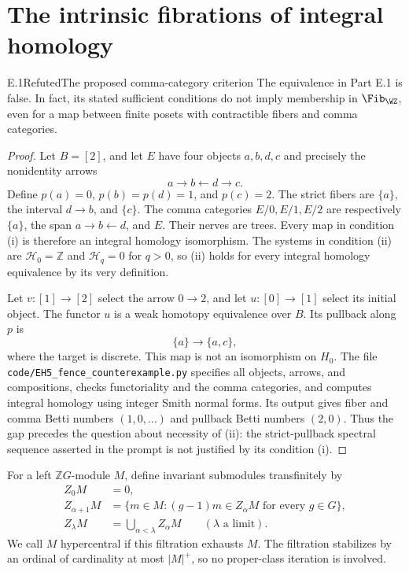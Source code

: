 \section{The intrinsic fibrations of integral homology}

\begin{claim}{E.1}{Refuted}{The proposed comma-category criterion}
The equivalence in Part E.1 is false. In fact, its stated sufficient
conditions do not imply membership in $\Fib_{\WZ}$, even for a map
between finite posets with contractible fibers and comma categories.
\end{claim}
\begin{proof}
Let $B=[2]$, and let $E$ have four objects $a,b,d,c$ and precisely
the nonidentity arrows
\[
                         a\longrightarrow b\longleftarrow d
                           \longrightarrow c.
\]
Define $p(a)=0$, $p(b)=p(d)=1$, and $p(c)=2$. The strict fibers are
$\{a\}$, the interval $d\to b$, and $\{c\}$. The comma categories
$E/0,E/1,E/2$ are respectively $\{a\}$, the span $a\to b\leftarrow d$,
and $E$. Their nerves are trees. Every map in condition (i) is therefore
an integral homology isomorphism. The systems in condition (ii) are
$\mathcal H_0=\mathbb Z$ and $\mathcal H_q=0$ for $q>0$, so (ii)
holds for every integral homology equivalence by its very definition.

Let $v:[1]\to[2]$ select the arrow $0\to2$, and let
$u:[0]\to[1]$ select its initial object. The functor $u$ is a weak
homotopy equivalence over $B$. Its pullback along $p$ is
\[
                          \{a\}\longrightarrow\{a,c\},
\]
where the target is discrete. This map is not an isomorphism on $H_0$.
The file \texttt{code/EH5\_fence\_counterexample.py} specifies all objects,
arrows, and compositions, checks functoriality and the comma categories,
and computes integral homology using integer Smith normal forms.
Its output gives fiber and comma Betti numbers $(1,0,\ldots)$ and
pullback Betti numbers $(2,0)$. Thus the gap precedes the question
about necessity of (ii): the strict-pullback spectral sequence asserted
in the prompt is not justified by its condition (i).
\end{proof}

\begin{definition}
For a left $\mathbb ZG$-module $M$, define invariant submodules
transfinitely by
\[
 \begin{split}
 Z_0M&=0,\\
 Z_{\alpha+1}M&=\{m\in M:(g-1)m\in Z_\alpha M
                                      \text{ for every }g\in G\},\\
 Z_\lambda M&=\bigcup_{\alpha<\lambda}Z_\alpha M
                                      \qquad(\lambda\text{ a limit}).
 \end{split}
\]
We call $M$ hypercentral if this filtration exhausts $M$.
The filtration stabilizes by an ordinal of cardinality at most
$|M|^+$, so no proper-class iteration is involved.
\end{definition}

